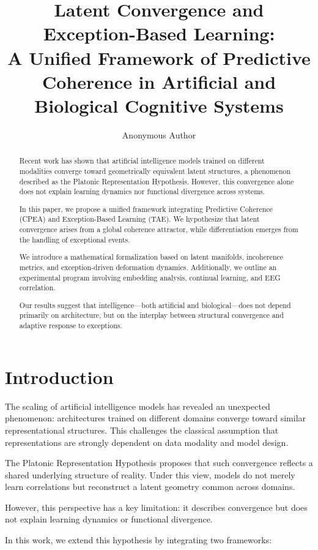 \documentclass[11pt]{article}
\title{Latent Convergence and Exception-Based Learning:\\
A Unified Framework of Predictive Coherence in Artificial and Biological Cognitive Systems}
\author{Anonymous Author}
\date{}
\begin{document}
\maketitle

\begin{abstract}
Recent work has shown that artificial intelligence models trained on different modalities converge toward geometrically equivalent latent structures, a phenomenon described as the Platonic Representation Hypothesis. However, this convergence alone does not explain learning dynamics nor functional divergence across systems.

In this paper, we propose a unified framework integrating Predictive Coherence (CPEA) and Exception-Based Learning (TAE). We hypothesize that latent convergence arises from a global coherence attractor, while differentiation emerges from the handling of exceptional events.

We introduce a mathematical formalization based on latent manifolds, incoherence metrics, and exception-driven deformation dynamics. Additionally, we outline an experimental program involving embedding analysis, continual learning, and EEG correlation.

Our results suggest that intelligence—both artificial and biological—does not depend primarily on architecture, but on the interplay between structural convergence and adaptive response to exceptions.
\end{abstract}

\section{Introduction}

The scaling of artificial intelligence models has revealed an unexpected phenomenon: architectures trained on different domains converge toward similar representational structures. This challenges the classical assumption that representations are strongly dependent on data modality and model design.

The Platonic Representation Hypothesis proposes that such convergence reflects a shared underlying structure of reality. Under this view, models do not merely learn correlations but reconstruct a latent geometry common across domains.

However, this perspective has a key limitation: it describes convergence but does not explain learning dynamics or functional divergence.

In this work, we extend this hypothesis by integrating two frameworks:
\end{document}
